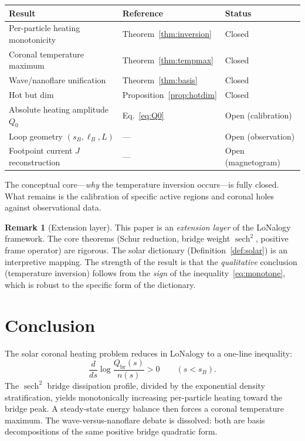\documentclass[12pt]{article}
\theoremstyle{plain}
\theoremstyle{definition}
\newtheorem{remark}[theorem]{Remark}
\numberwithin{equation}{section}
\newcommand{\br}{\mathrm{br}}
\DeclareMathOperator{\sech}{sech}
\begin{document}
\begin{center}
\begin{tabular}{lll}
\toprule
Result & Reference & Status\\
\midrule
Per-particle heating monotonicity & Theorem~\ref{thm:inversion} & Closed\\
Coronal temperature maximum & Theorem~\ref{thm:tempmax} & Closed\\
Wave/nanoflare unification & Theorem~\ref{thm:basis} & Closed\\
Hot but dim & Proposition~\ref{prop:hotdim} & Closed\\
\midrule
Absolute heating amplitude $Q_0$ & Eq.~\eqref{eq:Q0} & Open (calibration)\\
Loop geometry $(s_B,\ell_B,L)$ & --- & Open (observation)\\
Footpoint current $J$ reconstruction & --- & Open (magnetogram)\\
\bottomrule
\end{tabular}
\end{center}

The conceptual core---\emph{why} the temperature inversion
occurs---is fully closed.  What remains is the calibration of
specific active regions and coronal holes against observational
data.

\begin{remark}[Extension layer]
This paper is an \emph{extension layer} of the LoNalogy framework.
The core theorems (Schur reduction, bridge weight $\sech^2$,
positive frame operator) are rigorous.  The solar dictionary
(Definition~\ref{def:solar}) is an interpretive mapping.  The
strength of the result is that the \emph{qualitative} conclusion
(temperature inversion) follows from the \emph{sign} of the
inequality~\eqref{eq:monotone}, which is robust to the specific
form of the dictionary.
\end{remark}


\section*{Conclusion}

The solar coronal heating problem reduces in LoNalogy to a
one-line inequality:
\begin{equation}
\frac{d}{ds}\log\frac{Q_{\br}(s)}{n(s)} > 0
\qquad(s < s_B).
\end{equation}
The $\sech^2$ bridge dissipation profile, divided by the
exponential density stratification, yields monotonically
increasing per-particle heating toward the bridge peak.  A
steady-state energy balance then forces a coronal temperature
maximum.  The wave-versus-nanoflare debate is dissolved: both are
basis decompositions of the same positive bridge quadratic form.
\end{document}

